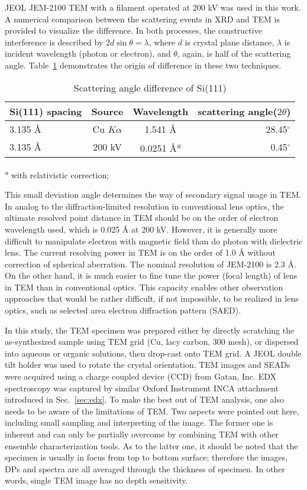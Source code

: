 JEOL JEM-2100 TEM with a  filament operated at 200 kV was used in this work. A numerical comparison between the scattering events in XRD and TEM is provided to visualize the difference. In both processes, the constructive interference is described by $2d\sin\theta = \lambda$, where $d$ is crystal plane distance, $\lambda$ is incident wavelength (photon or electron), and $\theta$, again, is half of the scattering angle. Table~\ref{tab:ch2tem} demonstrates the origin of difference in these two techniques.
\begin{table}[htb]
\centering
\caption{Scattering angle difference of Si(111)}\label{tab:ch2tem}
\begin{tabular}{lccr}
\toprule
Si(111) spacing & Source & Wavelength & scattering angle($2\theta$) \\
\midrule
3.135 \AA & Cu $K\alpha$ & 1.541 \AA & 28.45$^\circ$  \\
3.135 \AA & 200 kV & 0.0251 \si{\angstrom}\textsuperscript{\emph{a}}& 0.45$^\circ$  \\
\bottomrule
\end{tabular}

\textsuperscript{\emph{a}} with relativistic correction;
\end{table}
This small deviation angle determines the way of secondary signal usage in TEM. In analog to the diffraction-limited resolution in conventional lens optics, the ultimate resolved point distance in TEM should be on the order of electron wavelength used, which is 0.025 \si{\angstrom} at 200 kV. However, it is generally more difficult to manipulate electron with magnetic field than do photon with dielectric lens. The current resolving power in TEM is on the order of 1.0 \si{\angstrom} without correction of spherical aberration. The nominal resolution of JEM-2100 is 2.3 \si{\angstrom}. On the other hand, it is much easier to fine tune the power (focal length) of lens in TEM than in conventional optics. This capacity enables other observation approaches that would be rather difficult, if not impossible, to be realized in lens optics, such as selected area electron diffraction pattern (SAED). 

In this study, the TEM specimen was prepared either by directly scratching the as-synthesized sample using TEM grid (Cu, lacy carbon, 300 mesh), or dispersed into aqueous or organic solutions, then drop-cast onto TEM grid. A JEOL double tilt holder was used to rotate the crystal orientation. TEM images and SEADs were acquired using a charge coupled device (CCD) from Gatan, Inc. EDX spectroscopy was captured by similar Oxford Instrument INCA attachment introduced in Sec.~\ref{sec:edx}. To make the best out of TEM analysis, one also needs to be aware of the limitations of TEM. Two aspects were pointed out here, including small sampling and interpreting of the image. The former one is inherent and can only be partially overcome by combining TEM with other ensemble characterization tools. As to the latter one, it should be noted that the specimen is usually in focus from top to bottom surface; therefore the images, DPs and spectra are all averaged through the thickness of specimen. In other words, single TEM image has no depth sensitivity.\cite{Williams2009}  

